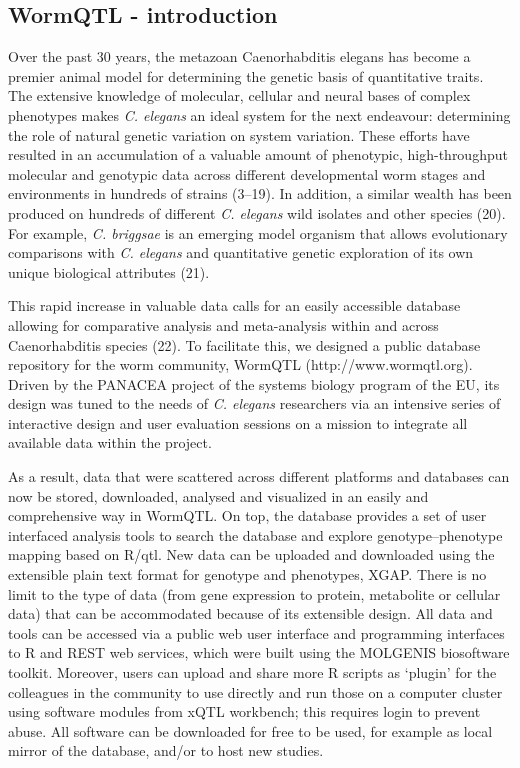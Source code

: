 \documentclass[8pt, twoside, a5paper]{report}
\newcommand{\italic}[1]{\textit{#1}}
\begin{document}
\subsection{WormQTL - introduction}
Over the past 30 years, the metazoan Caenorhabditis elegans has become a premier animal model for determining the genetic 
basis of quantitative traits\cite{Gaertner:2010, Kammenga:2008}. The extensive knowledge of molecular, cellular and neural 
bases of complex phenotypes makes \italic{C. elegans} an ideal system for the next endeavour: determining the role of natural genetic 
variation on system variation. These efforts have resulted in an accumulation of a valuable amount of phenotypic, 
high-throughput molecular and genotypic data across different developmental worm stages and environments in hundreds of 
strains (3–19). In addition, a similar wealth has been produced on hundreds of different \italic{C. elegans} wild isolates and 
other species (20). For example, \italic{C. briggsae} is an emerging model organism that allows evolutionary comparisons with 
\italic{C. elegans} and quantitative genetic exploration of its own unique biological attributes (21).

This rapid increase in valuable data calls for an easily accessible database allowing for comparative analysis and meta-analysis 
within and across Caenorhabditis species (22). To facilitate this, we designed a public database repository for the worm community, 
WormQTL (http://www.wormqtl.org). Driven by the PANACEA project of the systems biology program of the EU, its design was tuned 
to the needs of \italic{C. elegans} researchers via an intensive series of interactive design and user evaluation sessions on 
a mission to integrate all available data within the project.

As a result, data that were scattered across different platforms and databases can now be stored, downloaded, analysed and 
visualized in an easily and comprehensive way in WormQTL. On top, the database provides a set of user interfaced analysis 
tools to search the database and explore genotype–phenotype mapping based on R/qtl\cite{Broman:2003, Arends:2010}. New data can be uploaded and 
downloaded using the extensible plain text format for genotype and phenotypes, XGAP\cite{Swertz:2010a}. There is no limit to the type of 
data (from gene expression to protein, metabolite or cellular data) that can be accommodated because of its extensible design. 
All data and tools can be accessed via a public web user interface and programming interfaces to R and REST web services, 
which were built using the MOLGENIS biosoftware toolkit\cite{Swertz:2010b}. Moreover, users can upload and share more R scripts as ‘plugin’ 
for the colleagues in the community to use directly and run those on a computer cluster using software modules from xQTL 
workbench\cite{Arends:2012}; this requires login to prevent abuse. All software can be downloaded for free to be used, for example as 
local mirror of the database, and/or to host new studies.
\end{document}
